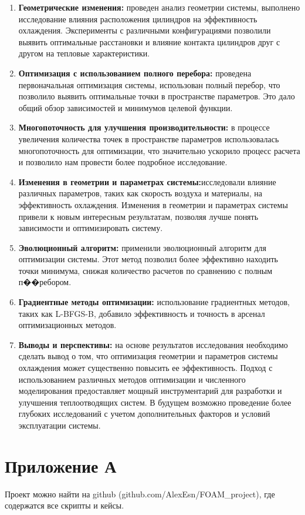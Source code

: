 \documentclass[a4paper,12pt]{article}
\theoremstyle{plain} %
\theoremstyle{definition} %
\theoremstyle{remark} %
\begin{document}
\begin{enumerate}
	\item \textbf{Геометрические изменения:} проведен анализ геометрии системы, выполнено исследование влияния расположения цилиндров на эффективность охлаждения. Эксперименты с различными конфигурациями позволили выявить оптимальные расстановки и влияние контакта цилиндров друг с другом на тепловые характеристики.
	      
	\item \textbf{Оптимизация с использованием полного перебора:} проведена первоначальная оптимизация системы, использован полный перебор, что позволило выявить оптимальные точки в пространстве параметров. Это дало общий обзор зависимостей и минимумов целевой функции.
	      
	\item \textbf{Многопоточность для улучшения производительности:} в процессе увеличения количества точек в пространстве параметров использовалась многопоточность для оптимизации, что значительно ускорило процесс расчета и позволило нам провести более подробное исследование.
	      
	\item \textbf{Изменения в геометрии и параметрах системы:}исследовали влияние различных параметров, таких как скорость воздуха и материалы, на эффективность охлаждения. Изменения в геометрии и параметрах системы привели к новым интересным результатам, позволяя лучше понять зависимости и оптимизировать систему.
	      
	\item \textbf{Эволюционный алгоритм:} применили эволюционный алгоритм для оптимизации системы. Этот метод позволил более эффективно находить точки минимума, снижая количество расчетов по сравнению с полным п��ребором.
	      
	\item \textbf{Градиентные методы оптимизации:} использование градиентных методов, таких как L-BFGS-B, добавило эффективность и точность в арсенал оптимизационных методов.
	      
	\item \textbf{Выводы и перспективы:} на основе результатов исследования необходимо сделать вывод о том, что оптимизация геометрии и параметров системы охлаждения может существенно повысить ее эффективность. Подход с использованием различных методов оптимизации и численного моделирования предоставляет мощный инструментарий для разработки и улучшения теплоотводящих систем. В будущем возможно проведение более глубоких исследований с учетом дополнительных факторов и условий эксплуатации системы.
\end{enumerate}

\newpage

\newpage
\section*{Приложение А}
Проект можно найти на github (github.com/AlexEsn/FOAM\_project), где содержатся все скрипты и кейсы.
\end{document}
